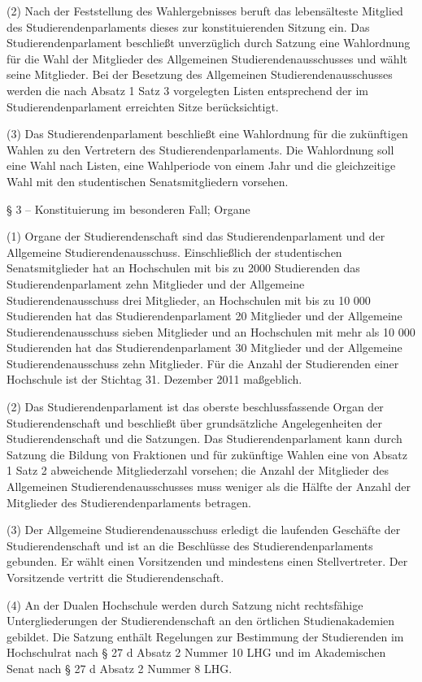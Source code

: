 \documentclass[
10pt,
a4paper,
twoside,								%
titlepage=false,							%
draft=false								%
]{scrartcl}
\begin{document}
(2) Nach der Feststellung des Wahlergebnisses beruft das lebensälteste Mitglied des Studierendenparlaments dieses zur konstituierenden Sitzung ein. Das Studierendenparlament beschließt unverzüglich durch Satzung eine Wahlordnung für die Wahl der Mitglieder des Allgemeinen Studierendenausschusses und wählt seine Mitglieder. Bei der Besetzung des Allgemeinen Studierendenausschusses werden die nach Absatz 1 Satz 3 vorgelegten Listen entsprechend der im Studierendenparlament erreichten Sitze berücksichtigt.

(3) Das Studierendenparlament beschließt eine Wahlordnung für die zukünftigen Wahlen zu den Vertretern des Studierendenparlaments. Die Wahlordnung soll eine Wahl nach Listen, eine Wahlperiode von einem Jahr und die gleichzeitige Wahl mit den studentischen Senatsmitgliedern vorsehen.


§ 3 – Konstituierung im besonderen Fall; Organe

(1) Organe der Studierendenschaft sind das Studierendenparlament und der Allgemeine Studierendenausschuss. Einschließlich der studentischen Senatsmitglieder hat an Hochschulen mit bis zu 2000 Studierenden das Studierendenparlament zehn Mitglieder und der Allgemeine Studierendenausschuss drei Mitglieder, an Hochschulen mit bis zu 10 000 Studierenden hat das Studierendenparlament 20 Mitglieder und der Allgemeine Studierendenausschuss sieben Mitglieder und an Hochschulen mit mehr als 10 000 Studierenden hat das Studierendenparlament 30 Mitglieder und der Allgemeine Studierendenausschuss zehn Mitglieder. Für die Anzahl der Studierenden einer Hochschule ist der Stichtag 31. Dezember 2011 maßgeblich.

(2) Das Studierendenparlament ist das oberste beschlussfassende Organ der Studierendenschaft und beschließt über grundsätzliche Angelegenheiten der Studierendenschaft und die Satzungen. Das Studierendenparlament kann durch Satzung die Bildung von Fraktionen und für zukünftige Wahlen eine von Absatz 1 Satz 2 abweichende Mitgliederzahl vorsehen; die Anzahl der Mitglieder des Allgemeinen Studierendenausschusses muss weniger als die Hälfte der Anzahl der Mitglieder des
Studierendenparlaments betragen.

(3) Der Allgemeine Studierendenausschuss erledigt die laufenden Geschäfte der Studierendenschaft und ist an die Beschlüsse des Studierendenparlaments gebunden. Er wählt einen Vorsitzenden und mindestens einen Stellvertreter. Der Vorsitzende vertritt die Studierendenschaft.

(4) An der Dualen Hochschule werden durch Satzung nicht rechtsfähige Untergliederungen der Studierendenschaft an den örtlichen Studienakademien gebildet. Die Satzung enthält Regelungen zur Bestimmung der Studierenden im Hochschulrat nach § 27 d Absatz 2 Nummer 10 LHG und im Akademischen Senat nach § 27 d Absatz 2 Nummer 8 LHG.
\end{document}
